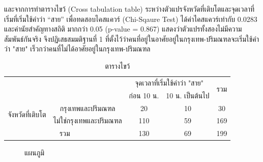 \documentclass[a4paper]{article}
\begin{document}
    และจากการทำตารางไขว้ (Cross tabulation table) ระหว่างตัวแปรจังหวัดที่เติบโตและจุดเวลาที่เริ่มที่เริ่มใช้คำว่า “สาย” เพื่อทดสอบไคสแควร์ (Chi-Sqaure Test) ได้ค่าไคสแควร์เท่ากับ 0.0283 และค่านัยสำคัญทางสถิติ มากกว่า 0.05 (p-value = 0.867) แสดงว่าตัวแปรทั้งสองไม่มีความสัมพันธ์กันจริง จึงปฏิเสธสมมติฐานที่ 1 ที่ตั้งไว้ว่าคนที่อยู่ในอาศัยอยู่ในกรุงเทพ-ปริมณฑลจะเริ่มใช้คำว่า "สาย" เร็วกว่าคนที่ไม่ได้อาศัยอยู่ในกรุงเทพ-ปริมณฑล
    \begin{table}[!ht]
        \begin{center}
        \begin{tabular}{|c|c|c|c|c|}
            \cline{3-5}
            \multicolumn{2}{c|}{} & \multicolumn{2}{c|}{จุดเวลาที่เริ่มใช้คำว่า "สาย"} & \multirow{2}{*}{รวม} \\
            \cline{3-4}
            \multicolumn{2}{c|}{} & ก่อน 10 น. & 10 น. เป็นต้นไป & \\
            \hline
            \multirow{2}{*}{จังหวัดที่เติบโต} & กรุงเทพและปริมณฑล & 20 & 10 & 30 \\
            \cline{2-5}
            & ไม่ใช่กรุงเทพและปริมณฑล & 110 & 59 & 169 \\
            \hline
            \multicolumn{2}{|c|}{รวม} & 130 & 69 & 199 \\
            \hline
        \end{tabular}
        \end{center}
        \caption{ตารางไขว้}
    \end{table}
    \begin{figure}[!ht]
        \begin{center}
        \end{center}
        \caption{แผนภูมิ}
    \end{figure}
\end{document}
